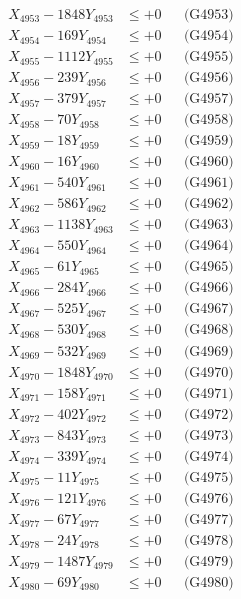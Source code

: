 \documentclass[a4paper,10pt]{article}
\begin{document}
{\begin{align}
X_{4953} - 1848Y_{4953} &\leq +0 && \text{(G4953)} \\
X_{4954} - 169Y_{4954} &\leq +0 && \text{(G4954)} \\
X_{4955} - 1112Y_{4955} &\leq +0 && \text{(G4955)} \\
X_{4956} - 239Y_{4956} &\leq +0 && \text{(G4956)} \\
X_{4957} - 379Y_{4957} &\leq +0 && \text{(G4957)} \\
X_{4958} - 70Y_{4958} &\leq +0 && \text{(G4958)} \\
X_{4959} - 18Y_{4959} &\leq +0 && \text{(G4959)} \\
X_{4960} - 16Y_{4960} &\leq +0 && \text{(G4960)} \\
\allowbreak
X_{4961} - 540Y_{4961} &\leq +0 && \text{(G4961)} \\
X_{4962} - 586Y_{4962} &\leq +0 && \text{(G4962)} \\
X_{4963} - 1138Y_{4963} &\leq +0 && \text{(G4963)} \\
X_{4964} - 550Y_{4964} &\leq +0 && \text{(G4964)} \\
X_{4965} - 61Y_{4965} &\leq +0 && \text{(G4965)} \\
X_{4966} - 284Y_{4966} &\leq +0 && \text{(G4966)} \\
X_{4967} - 525Y_{4967} &\leq +0 && \text{(G4967)} \\
X_{4968} - 530Y_{4968} &\leq +0 && \text{(G4968)} \\
X_{4969} - 532Y_{4969} &\leq +0 && \text{(G4969)} \\
X_{4970} - 1848Y_{4970} &\leq +0 && \text{(G4970)} \\
\allowbreak
X_{4971} - 158Y_{4971} &\leq +0 && \text{(G4971)} \\
X_{4972} - 402Y_{4972} &\leq +0 && \text{(G4972)} \\
X_{4973} - 843Y_{4973} &\leq +0 && \text{(G4973)} \\
X_{4974} - 339Y_{4974} &\leq +0 && \text{(G4974)} \\
X_{4975} - 11Y_{4975} &\leq +0 && \text{(G4975)} \\
X_{4976} - 121Y_{4976} &\leq +0 && \text{(G4976)} \\
X_{4977} - 67Y_{4977} &\leq +0 && \text{(G4977)} \\
X_{4978} - 24Y_{4978} &\leq +0 && \text{(G4978)} \\
X_{4979} - 1487Y_{4979} &\leq +0 && \text{(G4979)} \\
X_{4980} - 69Y_{4980} &\leq +0 && \text{(G4980)} \\

\end{align}}
\end{document}

